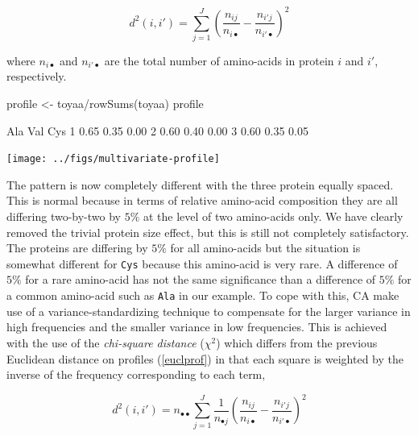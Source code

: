 \documentclass{article}
\begin{document}
\begin{equation}
d^2(i,i') = \sum_{j=1}^{J}(\frac{n_{ij}}{n_{i\bullet}} - \frac{n_{i'j}}{n_{i'\bullet}})^2
\label{euclprof}
\end{equation}

where $n_{i\bullet}$ and $n_{i'\bullet}$ are the total number of amino-acids
in protein $i$ and $i'$, respectively.

\begin{Schunk}
\begin{Sinput}
 profile <- toyaa/rowSums(toyaa)
 profile
\end{Sinput}
\begin{Soutput}
   Ala  Val  Cys
1 0.65 0.35 0.00
2 0.60 0.40 0.00
3 0.60 0.35 0.05
\end{Soutput}
\end{Schunk}
\texttt{[image: ../figs/multivariate-profile]}

The pattern is now completely different with the three protein equally spaced.
This is normal because in terms of relative amino-acid composition they are
all differing two-by-two by $5\%$ at the level of two amino-acids only. We
have clearly removed the trivial protein size effect, but this is still not completely
satisfactory. The proteins are differing by $5\%$ for all amino-acids but the situation 
is somewhat different for \texttt{Cys} because this amino-acid is very rare.
A difference of $5\%$ for a rare amino-acid has not the same significance than
a difference of $5\%$ for a common amino-acid such as \texttt{Ala} in our
example. To cope with this, CA make use of a variance-standardizing
technique to compensate for the larger variance in high frequencies and the 
smaller variance in low frequencies. This is achieved with the use of the 
\emph{chi-square distance} ($\chi^2$) which differs from the previous Euclidean distance 
on profiles (\ref{euclprof}) in that each square is weighted by the inverse of 
the frequency corresponding to each term,

\begin{equation}
d^2(i,i') = n_{\bullet\bullet}\sum_{j=1}^{J}\frac{1}{n_{{\bullet}j}}(\frac{n_{ij}}{n_{i\bullet}} - \frac{n_{i'j}}{n_{i'\bullet}})^2
\label{chi}
\end{equation}
\end{document}
